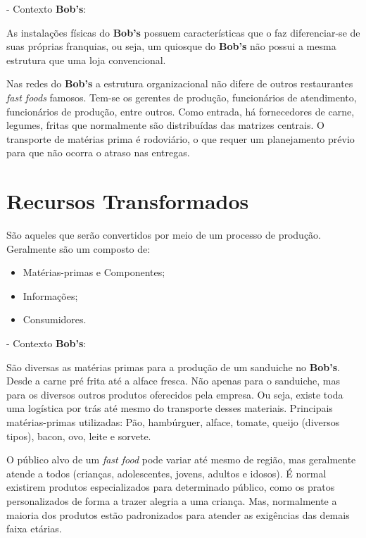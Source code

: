		- Contexto \textbf{Bob’s}:

		As instalações físicas do \textbf{Bob’s} possuem características que o faz diferenciar-se de suas próprias franquias, ou seja, um quiosque do \textbf{Bob’s} não possui a mesma estrutura que uma loja convencional.
		
		Nas redes do \textbf{Bob’s} a estrutura organizacional não difere de outros restaurantes \emph{fast foods} famosos. Tem-se os gerentes de produção, funcionários de atendimento, funcionários de produção, entre outros. Como entrada, há fornecedores de carne, legumes, fritas que normalmente são distribuídas das matrizes centrais. O transporte de matérias prima é rodoviário, o que requer um planejamento prévio para que não ocorra o atraso nas entregas.


	\section[Recursos Transformados]{Recursos Transformados}
	\label{sec:dados_transformados}

		São aqueles que serão convertidos por meio de um processo de produção. Geralmente são um composto de: 

		\begin{itemize}
			\item{Matérias-primas e Componentes;}
			\item{Informações;}
			\item{Consumidores.}
		\end{itemize}
		
		- Contexto \textbf{Bob’s}:

		São diversas as matérias primas para a produção de um sanduiche no \textbf{Bob’s}. Desde a carne pré frita até a alface fresca. Não apenas para o sanduiche, mas para os diversos outros produtos oferecidos pela empresa. Ou seja, existe toda uma logística por trás até mesmo do transporte desses materiais. Principais matérias-primas utilizadas: Pão, hambúrguer, alface, tomate, queijo (diversos tipos), bacon, ovo, leite e sorvete.

		O público alvo de um \emph{fast food} pode variar até mesmo de região, mas geralmente atende a todos (crianças, adolescentes, jovens, adultos e idosos). É normal existirem produtos especializados para determinado público, como os pratos personalizados de forma a trazer alegria a uma criança. Mas, normalmente a maioria dos produtos estão padronizados para atender as exigências das demais faixa etárias.

